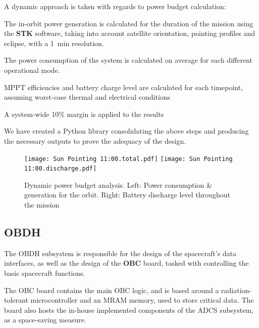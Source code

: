 \documentclass[a4paper,nobib]{tufte-book}
\begin{document}
\FloatBarrier
A dynamic approach is taken with regards to power budget calculation:
\begin{compactenum}
	\item The in-orbit power generation is calculated for the duration of the mission using the \textbf{STK} software, taking into account satellite orientation, pointing profiles and eclipse, with a \SI{1}{\minute} resolution.
	\item The power consumption of the system is calculated on average for each different operational mode.
	\item \acs{MPPT} efficiencies and battery charge level are calculated for each timepoint, assuming worst-case thermal and electrical conditions
	\item A system-wide 10\% margin is applied to the results
\end{compactenum}

We have created a Python library consolidating the above steps and producing the necessary outputs to prove the adequacy of the design.

\begin{figure}[h]
	\texttt{[image: Sun Pointing 11:00.total.pdf]}
	\hfill
	\texttt{[image: Sun Pointing 11:00.discharge.pdf]}

	\caption[Dynamic power budget analysis]{Dynamic power budget analysis. Left: Power consumption \& generation for the orbit. Right: Battery discharge level throughout the mission}
\end{figure}

\subsection{\acf{OBDH}}
\label{sec:obdh}

The \ac{OBDH} subsystem is responsible for the design of the spacecraft's data interfaces, as well as the design of the \textbf{\acf{OBC}} board, tasked with controlling the basic spacecraft functions.\autocite{DDJF_OBDH}

The \ac{OBC} board contains the main \ac{OBC} logic, and is based around a  radiation-tolerant microcontroller and an \acs{MRAM} memory, used to store critical data. The board also hosts the in-house implemented components of the \ac{ADCS} subsystem, as a space-saving measure.
\end{document}
